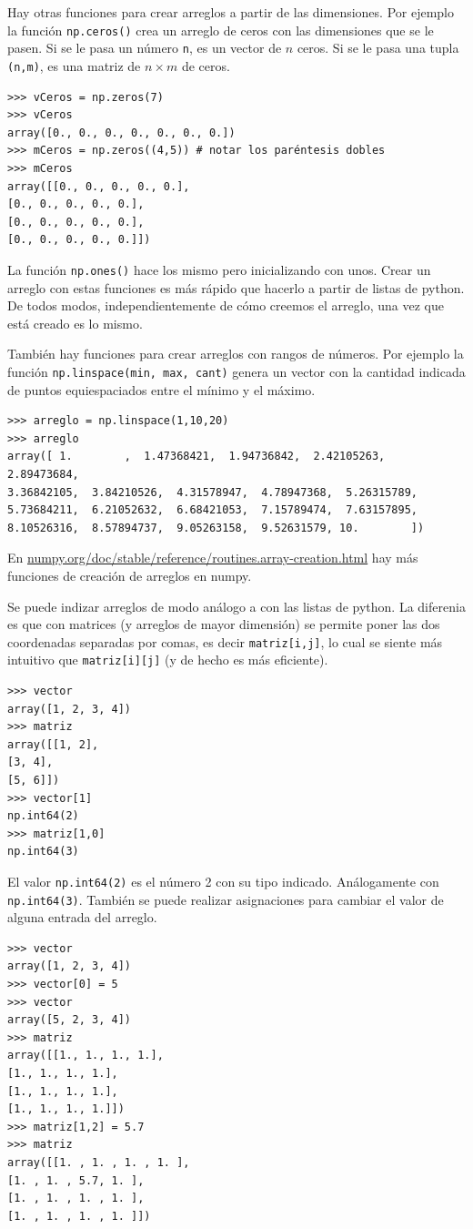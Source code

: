 \documentclass[a4paper, 12pt]{report}
\theoremstyle{definition}
\begin{document}
Hay otras funciones para crear arreglos a partir de las dimensiones. Por ejemplo la función {\tt np.ceros()} crea un arreglo de ceros con las dimensiones que se le pasen. Si se le pasa un número {\tt n}, es un vector de $n$ ceros. Si se le pasa una tupla {\tt (n,m)}, es una matriz de $n\times m$ de ceros.
\begin{verbatim}
>>> vCeros = np.zeros(7)
>>> vCeros
array([0., 0., 0., 0., 0., 0., 0.])
>>> mCeros = np.zeros((4,5)) # notar los paréntesis dobles
>>> mCeros
array([[0., 0., 0., 0., 0.],
[0., 0., 0., 0., 0.],
[0., 0., 0., 0., 0.],
[0., 0., 0., 0., 0.]])
\end{verbatim}
La función {\tt np.ones()} hace los mismo pero inicializando con unos. Crear un arreglo con estas funciones es más rápido que hacerlo a partir de listas de python. De todos modos, independientemente de cómo creemos el arreglo, una vez que está creado es lo mismo.

También hay funciones para crear arreglos con rangos de números. Por ejemplo la función {\tt np.linspace(min, max, cant)} genera un vector con la cantidad indicada de puntos equiespaciados entre el mínimo y el máximo.
\begin{verbatim}
>>> arreglo = np.linspace(1,10,20)
>>> arreglo
array([ 1.        ,  1.47368421,  1.94736842,  2.42105263,  2.89473684,
3.36842105,  3.84210526,  4.31578947,  4.78947368,  5.26315789,
5.73684211,  6.21052632,  6.68421053,  7.15789474,  7.63157895,
8.10526316,  8.57894737,  9.05263158,  9.52631579, 10.        ])
\end{verbatim}
En \href{https://numpy.org/doc/stable/reference/routines.array-creation.html}{numpy.org/doc/stable/reference/routines.array-creation.html} hay más funciones de creación de arreglos en numpy.

Se puede indizar arreglos de modo análogo a con las listas de python. La diferenia es que con matrices (y arreglos de mayor dimensión) se permite poner las dos coordenadas separadas por comas, es decir {\tt matriz[i,j]}, lo cual se siente más intuitivo que {\tt matriz[i][j]} (y de hecho es más eficiente).
\begin{verbatim}
>>> vector
array([1, 2, 3, 4])
>>> matriz
array([[1, 2],
[3, 4],
[5, 6]])
>>> vector[1]
np.int64(2)
>>> matriz[1,0]
np.int64(3)
\end{verbatim}
El valor {\tt np.int64(2)} es el número 2 con su tipo indicado. Análogamente con {\tt np.int64(3)}. También se puede realizar asignaciones para cambiar el valor de alguna entrada del arreglo.
\begin{verbatim}
>>> vector
array([1, 2, 3, 4])
>>> vector[0] = 5
>>> vector
array([5, 2, 3, 4])
>>> matriz
array([[1., 1., 1., 1.],
[1., 1., 1., 1.],
[1., 1., 1., 1.],
[1., 1., 1., 1.]])
>>> matriz[1,2] = 5.7
>>> matriz
array([[1. , 1. , 1. , 1. ],
[1. , 1. , 5.7, 1. ],
[1. , 1. , 1. , 1. ],
[1. , 1. , 1. , 1. ]])
\end{verbatim}
\end{document}
